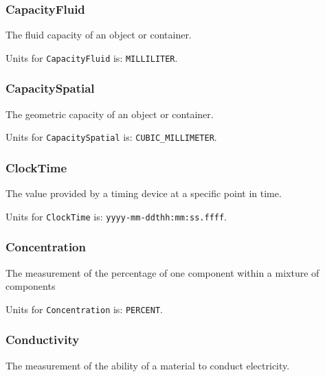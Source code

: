 \subsubsection{CapacityFluid}
\label{sec:CapacityFluid}



The fluid capacity of an object or container.


Units for \texttt{CapacityFluid} is: \texttt{MILLILITER}.

\FloatBarrier

\subsubsection{CapacitySpatial}
\label{sec:CapacitySpatial}



The geometric capacity of an object or container.


Units for \texttt{CapacitySpatial} is: \texttt{CUBIC_MILLIMETER}.

\FloatBarrier

\subsubsection{ClockTime}
\label{sec:ClockTime}



The value provided by a timing device at a specific point in time.


Units for \texttt{ClockTime} is: \texttt{yyyy-mm-ddthh:mm:ss.ffff}.

\FloatBarrier

\subsubsection{Concentration}
\label{sec:Concentration}



The measurement of the percentage of one component within a mixture of components


Units for \texttt{Concentration} is: \texttt{PERCENT}.

\FloatBarrier

\subsubsection{Conductivity}
\label{sec:Conductivity}



The measurement of the ability of a material to conduct electricity.


